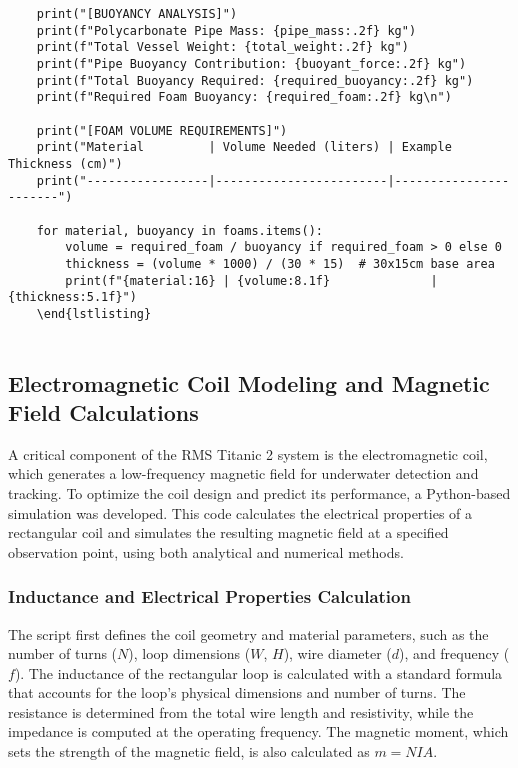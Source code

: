 \begin{verbatim}
    print("[BUOYANCY ANALYSIS]")
    print(f"Polycarbonate Pipe Mass: {pipe_mass:.2f} kg")
    print(f"Total Vessel Weight: {total_weight:.2f} kg")
    print(f"Pipe Buoyancy Contribution: {buoyant_force:.2f} kg")
    print(f"Total Buoyancy Required: {required_buoyancy:.2f} kg")
    print(f"Required Foam Buoyancy: {required_foam:.2f} kg\n")
    
    print("[FOAM VOLUME REQUIREMENTS]")
    print("Material         | Volume Needed (liters) | Example Thickness (cm)")
    print("-----------------|------------------------|-----------------------")
    
    for material, buoyancy in foams.items():
        volume = required_foam / buoyancy if required_foam > 0 else 0
        thickness = (volume * 1000) / (30 * 15)  # 30x15cm base area
        print(f"{material:16} | {volume:8.1f}              | {thickness:5.1f}")
    \end{lstlisting}
    
\end{verbatim}

\subsection{Electromagnetic Coil Modeling and Magnetic Field Calculations}
A critical component of the RMS Titanic 2 system is the electromagnetic coil, which generates a low-frequency magnetic field for underwater detection and tracking. To optimize the coil design and predict its performance, a Python-based simulation was developed. This code calculates the electrical properties of a rectangular coil and simulates the resulting magnetic field at a specified observation point, using both analytical and numerical methods.

\subsubsection{Inductance and Electrical Properties Calculation}
The script first defines the coil geometry and material parameters, such as the number of turns ($N$), loop dimensions ($W$, $H$), wire diameter ($d$), and frequency ($f$). The inductance of the rectangular loop is calculated with a standard formula that accounts for the loop's physical dimensions and number of turns. The resistance is determined from the total wire length and resistivity, while the impedance is computed at the operating frequency. The magnetic moment, which sets the strength of the magnetic field, is also calculated as $m = NIA$.

